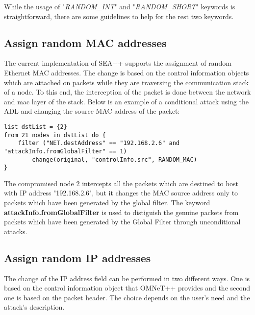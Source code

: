 While the usage of "\emph{RANDOM\_INT}" and "\emph{RANDOM\_SHORT}" keywords is straightforward, there are some guidelines to help for the rest two keywords. 

\subsection{Assign random MAC addresses}
The current implementation of SEA++ supports the assignment of random Ethernet MAC addresses. The change is based on the control information objects which are attached on packets while they are traversing the communication stack of a node. To this end, the interception of the packet is done between the network and mac layer of the stack. Below is an example of a conditional attack using the ADL and changing the source MAC address of the packet:
\begin{lstlisting}[language={asl}, caption={Assign random MAC source address}]
list dstList = {2} 
from 21 nodes in dstList do {
	filter ("NET.destAddress" == "192.168.2.6" and "attackInfo.fromGlobalFilter" == 1)
		change(original, "controlInfo.src", RANDOM_MAC)
}
\end{lstlisting}

The compromised node 2 intercepts all the packets which are destined to host with IP address "192.168.2.6", but it changes the MAC source address only to packets which have been generated by the global filter. The keyword \textbf{attackInfo.fromGlobalFilter} is used to distiguish the genuine packets from packets which have been generated by the Global Filter through unconditional attacks.

\subsection{Assign random IP addresses}
The change of the IP address field can be performed in two different ways. One is based on the control information object that OMNeT++ provides and the second one is based on the packet header. The choice depends on the user's need and the attack's description.

